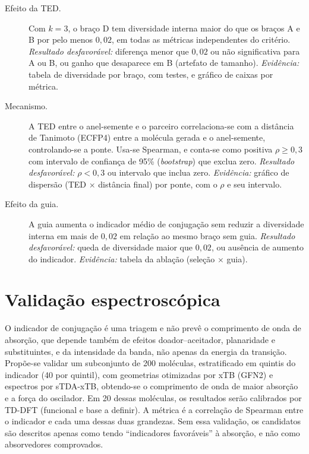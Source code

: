 \begin{description}
	\item[Efeito da TED.] Com $k=3$, o braço D tem diversidade interna maior do que os braços A e B por pelo menos $0{,}02$, em todas as métricas independentes do critério. \emph{Resultado desfavorável:} diferença menor que $0{,}02$ ou não significativa para A ou B, ou ganho que desaparece em B (artefato de tamanho). \emph{Evidência:} tabela de diversidade por braço, com testes, e gráfico de caixas por métrica.
	\item[Mecanismo.] A TED entre o anel-semente e o parceiro correlaciona-se com a distância de Tanimoto (ECFP4) entre a molécula gerada e o anel-semente, controlando-se a ponte. Usa-se Spearman, e conta-se como positiva $\rho\geq 0{,}3$ com intervalo de confiança de 95\% (\textit{bootstrap}) que exclua zero. \emph{Resultado desfavorável:} $\rho<0{,}3$ ou intervalo que inclua zero. \emph{Evidência:} gráfico de dispersão (TED $\times$ distância final) por ponte, com o $\rho$ e seu intervalo.
	\item[Efeito da guia.] A guia aumenta o indicador médio de conjugação sem reduzir a diversidade interna em mais de $0{,}02$ em relação ao mesmo braço sem guia. \emph{Resultado desfavorável:} queda de diversidade maior que $0{,}02$, ou ausência de aumento do indicador. \emph{Evidência:} tabela da ablação (seleção $\times$ guia).
\end{description}

\section{Validação espectroscópica}
\label{sec:validacao}


O indicador de conjugação é uma triagem e não prevê o comprimento de onda de absorção, que depende também de efeitos doador--aceitador, planaridade e substituintes, e da intensidade da banda, não apenas da energia da transição. Propõe-se validar um subconjunto de 200 moléculas, estratificado em quintis do indicador (40 por quintil), com geometrias otimizadas por xTB (GFN2) e espectros por sTDA-xTB, obtendo-se o comprimento de onda de maior absorção e a força do oscilador. Em 20 dessas moléculas, os resultados serão calibrados por TD-DFT (funcional e base a definir). A métrica é a correlação de Spearman entre o indicador e cada uma dessas duas grandezas. Sem essa validação, os candidatos são descritos apenas como tendo ``indicadores favoráveis'' à absorção, e não como absorvedores comprovados.

